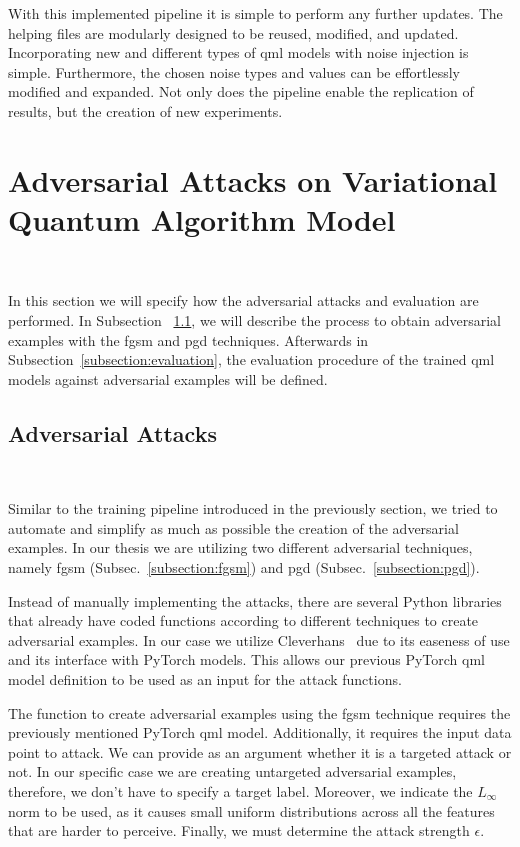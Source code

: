 With this implemented pipeline it is simple to perform
any further updates. The helping files are modularly
designed to be reused, modified, and updated. Incorporating
new and different types of \ac{qml} models with noise
injection is simple. Furthermore, the chosen noise types
and values can be effortlessly modified and expanded. 
Not only does the pipeline enable the replication of results,
but the creation of new experiments. \

\section{Adversarial Attacks on Variational Quantum Algorithm Model}\label{section:vqa_attacks} \

In this section we will specify how the adversarial
attacks and evaluation are performed. In Subsection
~\ref{subsection:adv_attacks}, we will describe the process
to obtain adversarial examples with the \ac{fgsm} and \ac{pgd}
techniques. Afterwards in Subsection~\ref{subsection:evaluation},
the evaluation procedure of the trained \ac{qml} models against
adversarial examples will be defined. \

\subsection{Adversarial Attacks}\label{subsection:adv_attacks}\

Similar to the training pipeline introduced in the previously
section, we tried to automate and simplify as much as possible
the creation of the adversarial examples. In our thesis we
are utilizing two different adversarial techniques, namely
\ac{fgsm} (Subsec.~\ref{subsection:fgsm}) and \ac{pgd}
(Subsec.~\ref{subsection:pgd}). \

Instead of manually implementing the attacks, there are
several Python libraries that already have coded functions according
to different techniques to create adversarial examples. In our
case we utilize Cleverhans~\cite{papernot_technical_2018} due
to its easeness of use and its interface with PyTorch models.
This allows our previous PyTorch \ac{qml} model definition to
be used as an input for the attack functions. \

The function to create adversarial examples using the
\ac{fgsm} technique requires the previously mentioned
PyTorch \ac{qml} model. Additionally, it requires the
input data point to attack. We can provide as an argument
whether it is a targeted attack or not. In our specific
case we are creating untargeted adversarial examples,
therefore, we don't have to specify a target label.
Moreover, we indicate the \(L_{\infty}\) norm to be used,
as it causes small uniform distributions across all
the features that are harder to perceive. Finally,
we must determine the attack strength \(\epsilon\). \

